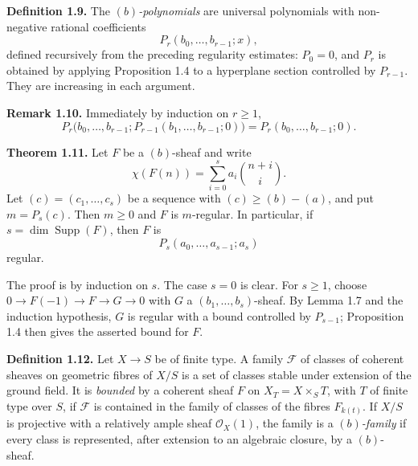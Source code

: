 \documentclass[11pt]{article}
\begin{document}
\textbf{Definition 1.9.} The \emph{$(b)$-polynomials} are universal polynomials with non-negative rational coefficients
\[
 P_r(b_0,\ldots,b_{r-1};x),
\]
defined recursively from the preceding regularity estimates: $P_0=0$, and $P_r$ is obtained by applying Proposition 1.4 to a hyperplane section controlled by $P_{r-1}$. They are increasing in each argument.

\textbf{Remark 1.10.} Immediately by induction on $r\ge1$,
\[
 P_r\bigl(b_0,\ldots,b_{r-1};P_{r-1}(b_1,\ldots,b_{r-1};0)\bigr)
 =P_r(b_0,\ldots,b_{r-1};0).
\]

\textbf{Theorem 1.11.} Let $F$ be a $(b)$-sheaf and write
\[
 \chi(F(n))=\sum_{i=0}^s a_i\binom{n+i}{i}.
\]
Let $(c)=(c_1,\ldots,c_s)$ be a sequence with $(c)\ge (b)-(a)$, and put $m=P_s(c)$. Then $m\ge0$ and $F$ is $m$-regular. In particular, if $s=\dim\operatorname{Supp}(F)$, then $F$ is
\[
 P_s(a_0,\ldots,a_{s-1};a_s)
\]
regular.

The proof is by induction on $s$. The case $s=0$ is clear. For $s\ge1$, choose $0\to F(-1)\to F\to G\to0$ with $G$ a $(b_1,\ldots,b_s)$-sheaf. By Lemma 1.7 and the induction hypothesis, $G$ is regular with a bound controlled by $P_{s-1}$; Proposition 1.4 then gives the asserted bound for $F$.

\textbf{Definition 1.12.} Let $X\to S$ be of finite type. A family $\mathcal F$ of classes of coherent sheaves on geometric fibres of $X/S$ is a set of classes stable under extension of the ground field. It is \emph{bounded} by a coherent sheaf $F$ on $X_T=X\times_S T$, with $T$ of finite type over $S$, if $\mathcal F$ is contained in the family of classes of the fibres $F_{k(t)}$. If $X/S$ is projective with a relatively ample sheaf $\mathcal O_X(1)$, the family is a \emph{$(b)$-family} if every class is represented, after extension to an algebraic closure, by a $(b)$-sheaf.
\end{document}
